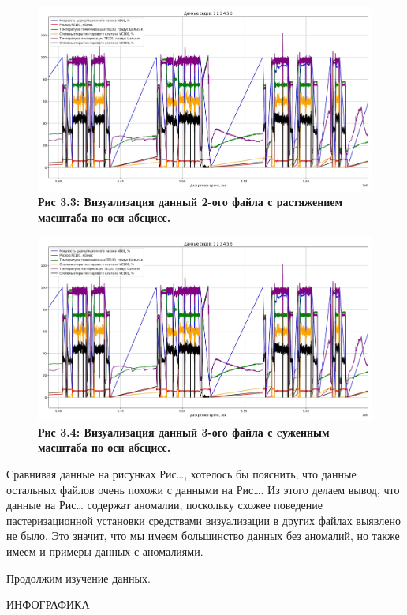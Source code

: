 {  \begin{figure}
    \centering
    \def\svgwidth{\textwidth}
    \includegraphics[width=\textwidth]{images/data_1_visual.jpg}
    \caption{\bfseries Рис 3.3: Визуализация данный 2-ого файла с растяжением масштаба по оси абсцисс.}
    \label{fig:NNBlackBox}
  \end{figure}

  \begin{figure}
    \centering
    \def\svgwidth{\textwidth}
    \includegraphics[width=\textwidth]{images/data_1_visual.jpg}
    \caption{\bfseries Рис 3.4: Визуализация данный 3-ого файла с cуженным масштаба по оси абсцисс.}
    \label{fig:NNBlackBox}
  \end{figure}

  \par \redline Сравнивая данные на рисунках Рис…, хотелось бы пояснить, что данные остальных файлов очень похожи с данными на Рис…. Из этого делаем вывод, что данные на Рис… содержат аномалии, поскольку схожее поведение пастеризационной установки средствами визуализации в других файлах выявлено не было. Это значит, что мы имеем большинство данных без аномалий, но также имеем и примеры данных с аномалиями. 

  \par \redline Продолжим изучение данных.

  ИНФОГРАФИКА
}

